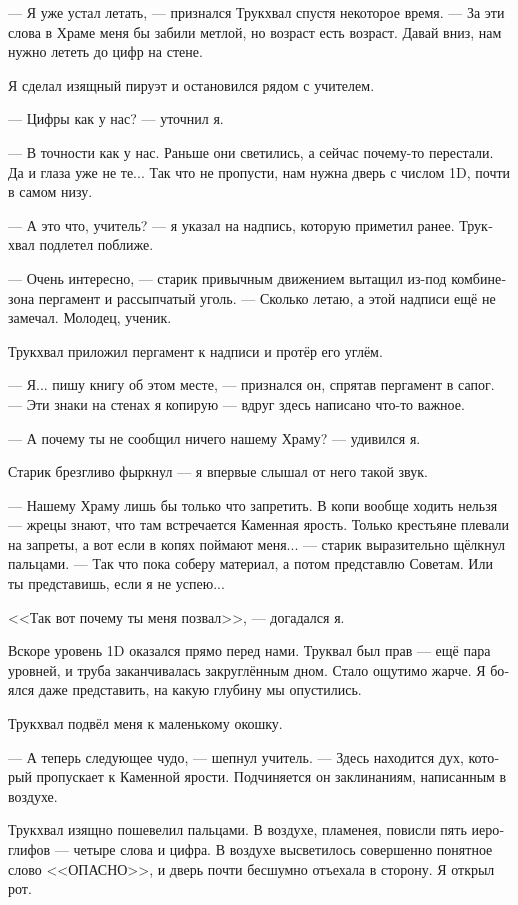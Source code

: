 \documentclass[a4paper,12pt,fleqn]{book}\usepackage{polyglossia}\setdefaultlanguage[babelshorthands=true]{russian}\setotherlanguage{english}\defaultfontfeatures{Ligatures=TeX,Mapping=tex-text}\usepackage{xcolor}\newcommand{\ml}[3]{#2}
\newcommand{\asterism}{\vspace{1em}{\centering\Large\bfseries$\ast~\ast~\ast$\par}\vspace{1em}}
\begin{document}
{\asterism

--- Я уже устал летать, --- признался Трукхвал спустя некоторое время.
--- За эти слова в Храме меня бы забили метлой, но возраст есть возраст.
Давай вниз, нам нужно лететь до цифр на стене.

Я сделал изящный пируэт и остановился рядом с учителем.

--- Цифры как у нас? --- уточнил я.

--- В точности как у нас.
Раньше они светились, а сейчас почему-то перестали.
Да и глаза уже не те...
Так что не пропусти, нам нужна дверь с числом 1D, почти в самом низу.

--- А это что, учитель? --- я указал на надпись, которую приметил ранее.
Трукхвал подлетел поближе.

--- Очень интересно, --- старик привычным движением вытащил из-под комбинезона пергамент и рассыпчатый уголь.
--- Сколько летаю, а этой надписи ещё не замечал.
Молодец, ученик.

Трукхвал приложил пергамент к надписи и протёр его углём.

--- Я... пишу книгу об этом месте, --- признался он, спрятав пергамент в сапог.
--- Эти знаки на стенах я копирую --- вдруг здесь написано что-то важное.

--- А почему ты не сообщил ничего нашему Храму? --- удивился я.

Старик брезгливо фыркнул --- я впервые слышал от него такой звук.

--- Нашему Храму лишь бы только что запретить.
В копи вообще ходить нельзя --- жрецы знают, что там встречается Каменная ярость.
Только крестьяне плевали на запреты, а вот если в копях поймают меня... --- старик выразительно щёлкнул пальцами.
--- Так что пока соберу материал, а потом представлю Советам.
Или ты представишь, если я не успею...

<<Так вот почему ты меня позвал>>, --- догадался я.

\asterism

Вскоре уровень 1D оказался прямо перед нами.
Труквал был прав --- ещё пара уровней, и труба заканчивалась закруглённым дном.
Стало ощутимо жарче.
Я боялся даже представить, на какую глубину мы опустились.

Трукхвал подвёл меня к маленькому окошку.

--- А теперь следующее чудо, --- шепнул учитель.
--- Здесь находится дух, который пропускает к Каменной ярости.
Подчиняется он заклинаниям, написанным в воздухе.

Трукхвал изящно пошевелил пальцами.
В воздухе, пламенея, повисли пять иероглифов --- четыре слова и цифра.
В воздухе высветилось совершенно понятное слово <<ОПАСНО>>, и дверь почти бесшумно отъехала в сторону.
Я открыл рот.

}
\end{document}
